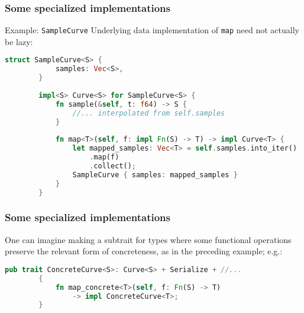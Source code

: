 \documentclass[10pt]{beamer}
\begin{document}
\begin{frame}[fragile]
    \frametitle{Some specialized implementations}
    \begin{exampleblock}{Example: \texttt{SampleCurve}}
    Underlying data implementation of \texttt{map} need not actually be lazy:
    \begin{lstlisting}[language=Rust, gobble=8]
        struct SampleCurve<S> {
            samples: Vec<S>,
        }
        
        impl<S> Curve<S> for SampleCurve<S> {
            fn sample(&self, t: f64) -> S {
                //... interpolated from self.samples
            }
            
            fn map<T>(self, f: impl Fn(S) -> T) -> impl Curve<T> {
                let mapped_samples: Vec<T> = self.samples.into_iter()
                    .map(f)
                    .collect();
                SampleCurve { samples: mapped_samples }
            }
        } 
	\end{lstlisting}
    \end{exampleblock}
\end{frame}

\begin{frame}[fragile]
    \frametitle{Some specialized implementations}
    One can imagine making a subtrait for types where some functional operations preserve the relevant form of concreteness, as in the preceding example; e.g.:
    \begin{lstlisting}[language=Rust, gobble=8]
        pub trait ConcreteCurve<S>: Curve<S> + Serialize + //...
        {
            fn map_concrete<T>(self, f: Fn(S) -> T)
                -> impl ConcreteCurve<T>;
        }
    \end{lstlisting}
\end{frame}
\end{document}
